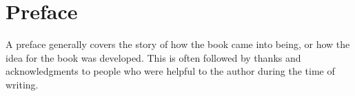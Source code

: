 
\chapter*{Preface} 
{}
A preface generally covers the story of how the book came into being, or how the idea for the book was developed. This is often followed by thanks and acknowledgments to people who were helpful to the author during the time of writing.

